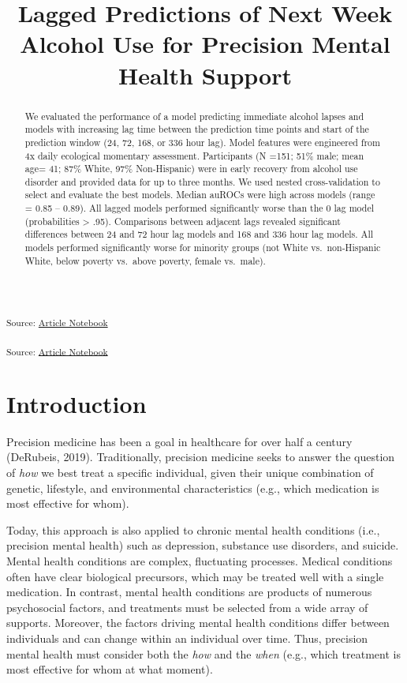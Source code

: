 \documentclass[
]{agujournal2019}
\begin{document}
\title{Lagged Predictions of Next Week Alcohol Use for Precision Mental
Health Support}



\begin{abstract}
We evaluated the performance of a model predicting immediate alcohol
lapses and models with increasing lag time between the prediction time
points and start of the prediction window (24, 72, 168, or 336 hour
lag). Model features were engineered from 4x daily ecological momentary
assessment. Participants (N =151; 51\% male; mean age= 41; 87\% White,
97\% Non-Hispanic) were in early recovery from alcohol use disorder and
provided data for up to three months. We used nested cross-validation to
select and evaluate the best models. Median auROCs were high across
models (range = 0.85 -- 0.89). All lagged models performed significantly
worse than the 0 lag model (probabilities \textgreater{} .95).
Comparisons between adjacent lags revealed significant differences
between 24 and 72 hour lag models and 168 and 336 hour lag models. All
models performed significantly worse for minority groups (not White
vs.~non-Hispanic White, below poverty vs.~above poverty, female
vs.~male).
\end{abstract}




\textsubscript{Source:
\href{https://jjcurtin.github.io/study_lag/index.qmd.html}{Article
Notebook}}

\textsubscript{Source:
\href{https://jjcurtin.github.io/study_lag/index.qmd.html}{Article
Notebook}}

\section{Introduction}\label{introduction}

Precision medicine has been a goal in healthcare for over half a century
(DeRubeis, 2019). Traditionally, precision medicine seeks to answer the
question of \emph{how} we best treat a specific individual, given their
unique combination of genetic, lifestyle, and environmental
characteristics (e.g., which medication is most effective for whom).

Today, this approach is also applied to chronic mental health conditions
(i.e., precision mental health) such as depression, substance use
disorders, and suicide. Mental health conditions are complex,
fluctuating processes. Medical conditions often have clear biological
precursors, which may be treated well with a single medication. In
contrast, mental health conditions are products of numerous psychosocial
factors, and treatments must be selected from a wide array of supports.
Moreover, the factors driving mental health conditions differ between
individuals and can change within an individual over time. Thus,
precision mental health must consider both the \emph{how} and the
\emph{when} (e.g., which treatment is most effective for whom at what
moment).
\end{document}
